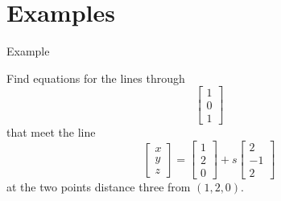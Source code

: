 \documentclass{beamer}
\begin{document}
\section{Examples}

\begin{frame}{Example}
    \begin{example}
        Find equations for the lines through
        \begin{equation*}
            \left[
            \begin{array}{c}
            1\\
            0\\
            1
            \end{array}
            \right]
        \end{equation*}
        that meet the line
        \begin{equation*}
            \left[
            \begin{array}{c}
            x\\
            y\\
            z
            \end{array}
            \right] = \left[
            \begin{array}{c}
            1\\
            2\\
            0
            \end{array}
            \right]+s \left[
            \begin{array}{c}
            2\\
            -1\\
            2
            \end{array}
            \right]
        \end{equation*}
        at the two points distance three from $(1, 2, 0)$.
    \end{example}
\end{frame}
\end{document}

